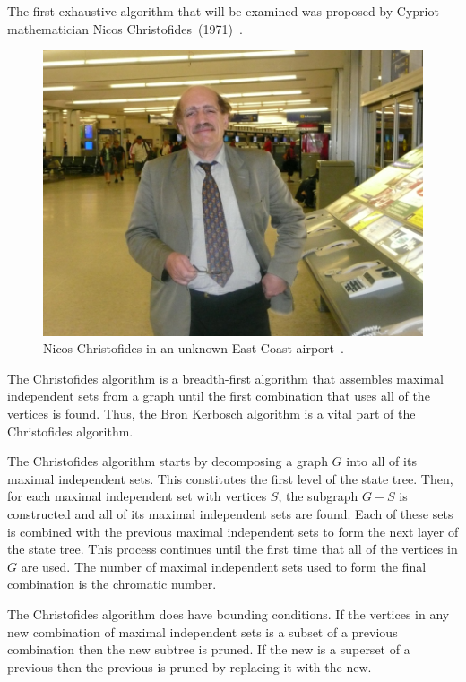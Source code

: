 The first exhaustive algorithm that will be examined was proposed by Cypriot mathematician Nicos
Christofides~(1971)~\cite{christofides}.

\begin{figure}[H]
  \centering
  \includegraphics[width=5in]{christofides}
  \caption{Nicos Christofides in an unknown East Coast airport~\cite{lotus}.}
  \label{fig:pic:christofides}
\end{figure}

The Christofides algorithm is a breadth-first algorithm that assembles maximal independent sets from a graph until
the first combination that uses all of the vertices is found.  Thus, the Bron Kerbosch algorithm is a vital part of
the Christofides algorithm.

The Christofides algorithm starts by decomposing a graph \(G\) into all of its maximal independent sets.  This
constitutes the first level of the state tree.  Then, for each maximal independent set with vertices \(S\), the
subgraph \(G-S\) is constructed and all of its maximal independent sets are found.  Each of these sets is combined
with the previous maximal independent sets to form the next layer of the state tree.  This process continues until
the first time that all of the vertices in \(G\) are used.  The number of maximal independent sets used to form the
final combination is the chromatic number.

The Christofides algorithm does have bounding conditions.  If the vertices in any new combination of maximal
independent sets is a subset of a previous combination then the new subtree is pruned.  If the new is a superset of
a previous then the previous is pruned by replacing it with the new.

